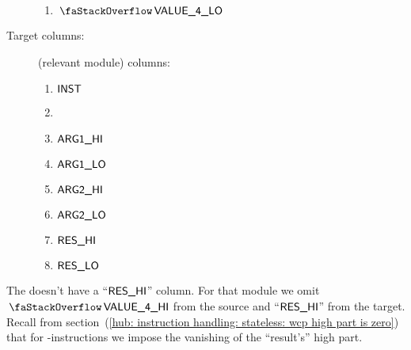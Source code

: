 \begin{description}
\begin{multicols}{4}
\begin{enumerate}
				\item $\stackItemValLo{4}$
			\end{enumerate}
		\end{multicols}
	\item[Target columns:] (relevant module) columns:
		\begin{multicols}{4}
			\begin{enumerate}
				\item $\textsf{INST}$
				\item[\vspace{\fill}]
				\item $\textsf{ARG}\textsf{1}\textsf{\_HI}$
				\item $\textsf{ARG}\textsf{1}\textsf{\_LO}$
				\item $\textsf{ARG}\textsf{2}\textsf{\_HI}$
				\item $\textsf{ARG}\textsf{2}\textsf{\_LO}$
				\item $\textsf{RES}\textsf{\_HI}$
				\item $\textsf{RES}\textsf{\_LO}$
			\end{enumerate}
		\end{multicols}
\end{description}
\saNote{}
The \wcpMod{} doesn't have a ``$\textsf{RES}\textsf{\_HI}$'' column.
For that module we omit $\stackItemValHi{4}$ from the source and ``$\textsf{RES}\textsf{\_HI}$'' from the target.
Recall from section~(\ref{hub: instruction handling: stateless: wcp high part is zero}) that for \wcpMod{}-instructions we impose the vanishing of the ``result's'' high part.
